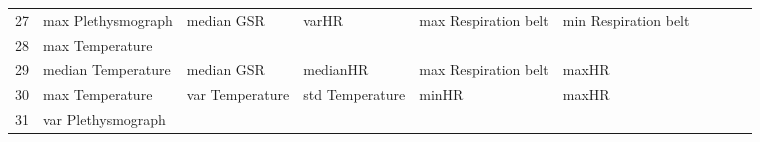 \begin{landscape}
\begin{table}[]
\begin{tabular}{l|llllllll}
27       & max Plethysmograph      & median GSR            & varHR                   & max Respiration belt    & min Respiration belt    &                       &                      &          &                      &        \\
28       & max Temperature         &                       &                         &                         &                         &                       &                      &          &                      &        \\
29       & median Temperature      & median GSR            & medianHR                & max Respiration belt    & maxHR                   &                       &                      &          &                      &        \\
30       & max Temperature         & var Temperature       & std Temperature         & minHR                   & maxHR                   &                       &                      &          &                      &        \\
31       & var Plethysmograph      &                       &                         &                         &                         &                       &                      &          &                      &        \\
\end{tabular}
\end{table}
\end{landscape}
\clearpage
